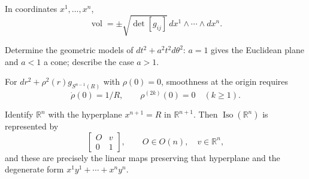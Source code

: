 \begin{remark}
  \label{rem:pet-ch1-ex-6}


  In coordinates $x^1,\ldots,x^n$,
  \[
    \operatorname{vol}
      =\pm\sqrt{\det[g_{ij}]}\,dx^1\wedge\cdots\wedge dx^n.
  \]
\end{remark}

\begin{remark}
  \label{rem:pet-ch1-ex-7}


  Determine the geometric models of
  $dt^2+a^2t^2d\theta^2$: $a=1$ gives the Euclidean plane and $a<1$ a cone;
  describe the case $a>1$.
\end{remark}

\begin{remark}
  \label{rem:pet-ch1-ex-8}


  For
  $dr^2+\rho^2(r)g_{S^{n-1}(R)}$ with $\rho(0)=0$, smoothness at the origin
  requires
  \[
    \dot\rho(0)=1/R,
    \qquad \rho^{(2k)}(0)=0\quad(k\ge1).
  \]
\end{remark}

\begin{remark}
  \label{rem:pet-ch1-ex-9}


  Identify $\mathbb{R}^n$ with the hyperplane $x^{n+1}=R$ in
  $\mathbb{R}^{n+1}$. Then $\operatorname{Iso}(\mathbb{R}^n)$ is represented by
  \[
    \left[\begin{smallmatrix}O&v\\0&1\end{smallmatrix}\right],
    \qquad O\in O(n),\quad v\in\mathbb{R}^n,
  \]
  and these are precisely the linear maps preserving that hyperplane and the
  degenerate form $x^1y^1+\cdots+x^ny^n$.
\end{remark}

